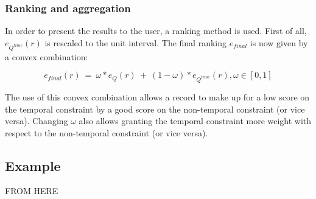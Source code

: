 \subsubsection{Ranking and aggregation}
In order to present the results to the user, a ranking method is used. First of all, $e_{Q^{time}}(r)$ is rescaled to the unit interval. The final ranking $e_{final}$ is now given by a convex combination:


\begin{equation}
\label{eq:convex-comb}
e_{final}(r)\ =\ \omega*e_{Q}(r)\ +\ (1-\omega)*e_{Q^{time}}(r), \omega \in \left[0, 1 \right]
\end{equation}

The use of this convex combination allows a record to make up for a low score on the temporal constraint by a good score on the non-temporal constraint (or vice versa). Changing $\omega$ also allows granting the temporal constraint more weight with respect to the non-temporal constraint (or vice versa).


\subsection{Example}

FROM HERE

